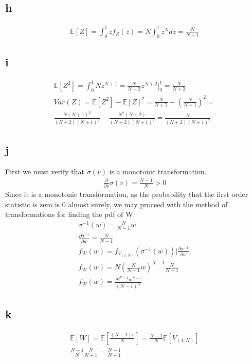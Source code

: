 \documentclass[10pt]{paper}
\begin{document}
\subsection*{h}

\begin{align*}
  \mathbb{E}[Z] = \int_0^1 zf_Z(z) = N \int_0^1 z^{N} dz = \frac{N}{N+1}
\end{align*}

\subsection*{i}

\begin{align*}
  \mathbb{E}[Z^2] = \int_0^1 N z^{N+1} = \frac{N}{N+2} z^{N+2} \big |_0^1 = \frac{N}{N+2}\\
  Var(Z) = \mathbb{E}[Z^2] - \mathbb{E}[Z]^2 = \frac{N}{N+2}-(\frac{N}{N+1})^2 =\\
  \frac{N(N+1)^2}{(N+2)(N+1)^2} - \frac{N^2(N+2)}{(N+2)(N+1)^2} = \frac{N}{(N+2)(N+1)^2}
\end{align*}

\subsection*{j}
First we must verify that $\sigma (v)$ is a monotonic transformation.
\begin{align*}
  \frac{\partial}{\partial v}\sigma (v) = \frac{N-1}{N} > 0
\end{align*}
Since it is a monotonic transformation, as the probability that the
first order statistic is zero is 0 almost surely, we may proceed with
the method of transformations for finding the pdf of W.
\begin{align*}
  \sigma^{-1}(w) = \frac{N}{N-1} w\\
  \frac{\partial \sigma^{-1}}{\partial w} = \frac{N}{N-1}\\
  f_W(w) = f_{V_{(1:N)}}( \sigma^{-1}(w ) ) \big | \frac{\partial \sigma^{-1}}{\partial w} \big |\\
  f_W(w) = N( \frac{N}{N-1} w )^{N-1} \frac{ N}{N-1}\\
  f_W(w) = \frac{N^{N+1} w^{N-1}}{(N-1)^N}
\end{align*}

\subsection*{k}
\begin{align*}
  \mathbb{E}[W] = \mathbb{E}[\frac{(N-1)v}{N}] = \frac{N-1}{N} \mathbb{E}[V_{(1:N)}]\\
  \frac{N-1}{N} \frac{N}{N+1} = \frac{N-1}{N+1}
\end{align*}
\end{document}
